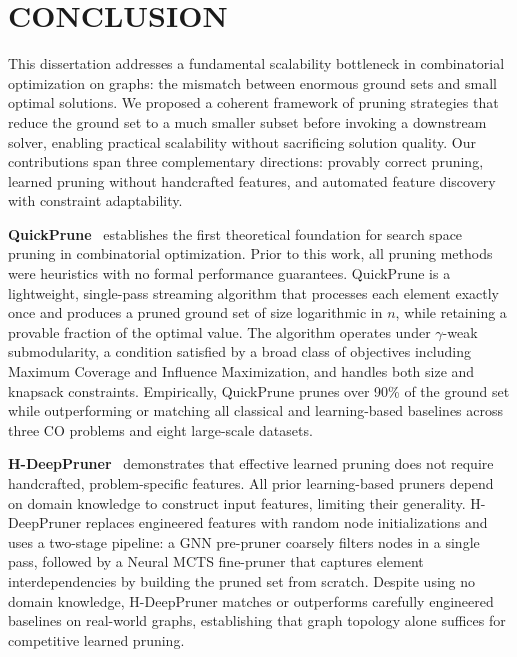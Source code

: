 \pagestyle{plain} %

\chapter{\uppercase{Conclusion}} \label{chap:conclusion}

This dissertation addresses a fundamental scalability bottleneck in combinatorial
optimization on graphs: the mismatch between enormous ground sets and small optimal
solutions. We proposed a coherent framework of pruning strategies that reduce the ground
set to a much smaller subset before invoking a downstream solver, enabling practical
scalability without sacrificing solution quality. Our contributions span three
complementary directions: provably correct pruning, learned pruning without handcrafted
features, and automated feature discovery with constraint adaptability.

\textbf{QuickPrune}~\citep{pmlr-v258-nath25a} establishes the first theoretical
foundation for search space pruning in combinatorial optimization. Prior to this work,
all pruning methods were heuristics with no formal performance guarantees. QuickPrune is
a lightweight, single-pass streaming algorithm that processes each element exactly once
and produces a pruned ground set of size logarithmic in $n$, while retaining a provable
fraction of the optimal value. The algorithm operates under $\gamma$-weak submodularity,
a condition satisfied by a broad class of objectives including Maximum Coverage and
Influence Maximization, and handles both size and knapsack constraints. Empirically,
QuickPrune prunes over 90\% of the ground set while outperforming or matching all
classical and learning-based baselines across three CO problems and eight large-scale
datasets.

\textbf{H-DeepPruner}~\citep{nath2025hdeeppruner} demonstrates that effective learned
pruning does not require handcrafted, problem-specific features. All prior learning-based
pruners depend on domain knowledge to construct input features, limiting their
generality. H-DeepPruner replaces engineered features with random node initializations
and uses a two-stage pipeline: a GNN pre-pruner coarsely filters nodes in a single pass,
followed by a Neural MCTS fine-pruner that captures element interdependencies by
building the pruned set from scratch. Despite using no domain knowledge, H-DeepPruner
matches or outperforms carefully engineered baselines on real-world graphs, establishing
that graph topology alone suffices for competitive learned pruning.

